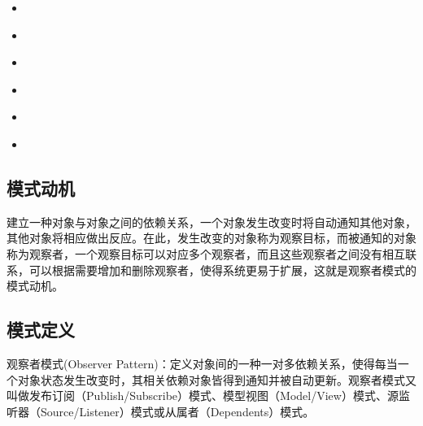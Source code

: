 \documentclass[letterpaper,10pt,english]{sphinxmanual}
\begin{document}
\begin{sphinxShadowBox}
\begin{itemize}
\begin{itemize}
\item {} 
\sphinxAtStartPar
{}\label{\detokenize{behavioral_patterns/observer:id24}}{\hyperref[\detokenize{behavioral_patterns/observer:id10}]{}}

\item {} 
\sphinxAtStartPar
{}\label{\detokenize{behavioral_patterns/observer:id25}}{\hyperref[\detokenize{behavioral_patterns/observer:id11}]{}}

\item {} 
\sphinxAtStartPar
{}\label{\detokenize{behavioral_patterns/observer:id26}}{\hyperref[\detokenize{behavioral_patterns/observer:id12}]{}}

\item {} 
\sphinxAtStartPar
{}\label{\detokenize{behavioral_patterns/observer:id27}}{\hyperref[\detokenize{behavioral_patterns/observer:id13}]{}}

\item {} 
\sphinxAtStartPar
{}\label{\detokenize{behavioral_patterns/observer:id28}}{\hyperref[\detokenize{behavioral_patterns/observer:id14}]{}}

\item {} 
\sphinxAtStartPar
{}\label{\detokenize{behavioral_patterns/observer:id29}}{\hyperref[\detokenize{behavioral_patterns/observer:id15}]{}}

\end{itemize}

\end{itemize}
\end{sphinxShadowBox}


\subsection{模式动机}
\label{\detokenize{behavioral_patterns/observer:id3}}
\sphinxAtStartPar
建立一种对象与对象之间的依赖关系，一个对象发生改变时将自动通知其他对象，其他对象将相应做出反应。在此，发生改变的对象称为观察目标，而被通知的对象称为观察者，一个观察目标可以对应多个观察者，而且这些观察者之间没有相互联系，可以根据需要增加和删除观察者，使得系统更易于扩展，这就是观察者模式的模式动机。


\subsection{模式定义}
\label{\detokenize{behavioral_patterns/observer:id4}}
\sphinxAtStartPar
观察者模式(Observer Pattern)：定义对象间的一种一对多依赖关系，使得每当一个对象状态发生改变时，其相关依赖对象皆得到通知并被自动更新。观察者模式又叫做发布\sphinxhyphen{}订阅（Publish/Subscribe）模式、模型\sphinxhyphen{}视图（Model/View）模式、源\sphinxhyphen{}监听器（Source/Listener）模式或从属者（Dependents）模式。
\end{document}
